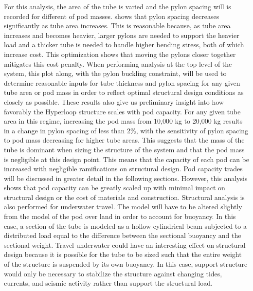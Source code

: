 For this analysis, the area of the tube is varied and the pylon spacing will is
recorded for different of pod masses. 
shows that pylon spacing decreases significantly as tube area increases.
This is reasonable because, as tube area increases and becomes heavier, larger
pylons are needed to support the heavier load and a thicker tube is needed to
handle higher bending stress, both of which increase cost. This optimization
shows that moving the pylons closer together mitigates this cost penalty.
When performing analysis at the top level of the system, this plot along,
with the pylon buckling constraint, will be used to determine reasonable inputs
for tube thickness and pylon spacing for any given tube area or pod mass in
order to reflect optimal structural design conditions as closely as possible.
These results also give us preliminary insight into how favorably the Hyperloop
structure scales with pod capacity. For any given tube area in this regime,
increasing the pod mass from 10,000 kg to 20,000 kg results in a change in
pylon spacing of less than 2\%, with the sensitivity of pylon spacing to pod
mass decreasing for higher tube areas. This suggests that the mass of the tube
is dominant when sizing the structure of the system and that the pod mass is
negligible at this design point. This means that the capacity of each pod can be
increased with negligible ramifications on structural design. Pod capacity
trades will be discussed in greater detail in the following sections. However,
this analysis shows that pod capacity can be greatly scaled up with minimal
impact on structural design or the cost of materials and construction.
Structural analysis is also performed for underwater travel.
The model will have to be altered slightly from the model of the pod over land
in order to account for buoyancy. In this case, a section of the tube is
modeled as a hollow cylindrical beam subjected to a distributed load equal to
the difference between the sectional buoyancy and the sectional weight.
Travel underwater could have an interesting effect on structural design because
it is possible for the tube to be sized such that the entire weight of the
structure is suspended by its own buoyancy. In this case, support structure
would only be necessary to stabilize the structure against changing tides,
currents, and seismic activity rather than support the structural load.

